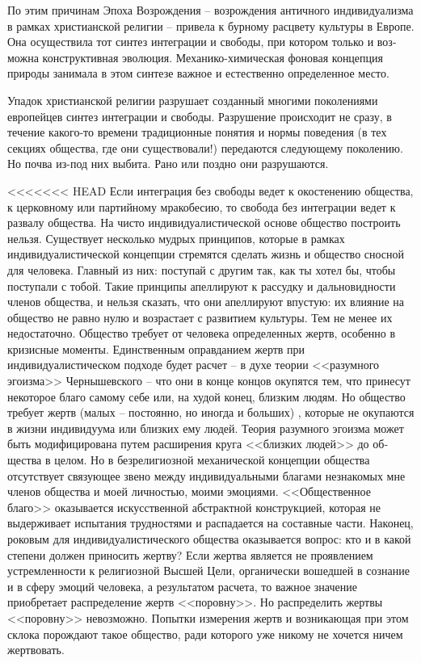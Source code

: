 \documentclass{book}
\begin{document}
По этим причинам Эпоха Возрождения -- возрождения антич­ного индивидуализма в рамках христианской религии -- при­вела к бурному расцвету культуры в Европе. Она осуществила тот синтез интеграции и свободы, при котором только и воз­можна конструктивная эволюция. Механико-химическая фоно­вая концепция природы занимала в этом синтезе важное и ес­тественно определенное место.

Упадок христианской религии разрушает созданный многи­ми поколениями европейцев синтез интеграции и свободы. Раз­рушение происходит не сразу, в течение какого-то времени традиционные понятия и нормы поведения (в тех секциях об­щества, где они существовали!) передаются следующему поколению. Но почва из-под них выбита. Рано или поздно они разру­шаются.

<<<<<<< HEAD
Если интеграция без свободы ведет к окостенению общест­ва, к церковному или партийному мракобесию, то свобода без интеграции ведет к развалу общества. На чисто индивидуали­стической основе общество построить нельзя. Существует не­сколько мудрых принципов, которые в рамках индивидуали­стической концепции стремятся сделать жизнь и общество снос­ной для человека. Главный из них: поступай с другим так, как ты хотел бы, чтобы поступали с тобой. Такие принципы апел­лируют к рассудку и дальновидности членов общества, и нель­зя сказать, что они апеллируют впустую: их влияние на общест­во не равно нулю и возрастает с развитием культуры. Тем не менее их недостаточно. Общество требует от человека опре­деленных жертв, особенно в кризисные моменты. Единственным оправданием жертв при индивидуалистическом подходе будет расчет -- в духе теории <<разумного эгоизма>> Чернышевского -- что они в конце концов окупятся тем, что принесут некоторое благо самому себе или, на худой конец, близким людям. Но об­щество требует жертв (малых -- постоянно, но иногда и боль­ших) , которые не окупаются в жизни индивидуума или близ­ких ему людей. Теория разумного эгоизма может быть моди­фицирована путем расширения круга <<близких людей>> до об­щества в целом. Но в безрелигиозной механической концеп­ции общества отсутствует связующее звено между индивиду­альными благами незнакомых мне членов общества и моей лич­ностью, моими эмоциями. <<Общественное благо>> оказывается искусственной абстрактной конструкцией, которая не выдер­живает испытания трудностями и распадается на составные части. Наконец, роковым для индивидуалистического общест­ва оказывается вопрос: кто и в какой степени должен прино­сить жертву? Если жертва является не проявлением устремлен­ности к религиозной Высшей Цели, органически вошедшей в сознание и в сферу эмоций человека, а результатом расчета, то важное значение приобретает распределение жертв <<поров­ну>>. Но распределить жертвы <<поровну>> невозможно. Попыт­ки измерения жертв и возникающая при этом склока порож­дают такое общество, ради которого уже никому не хочется ничем жертвовать.
\end{document}
